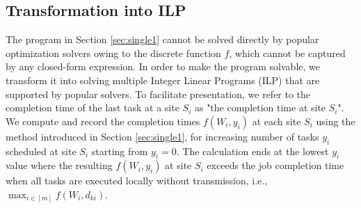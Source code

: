 \subsection{Transformation into ILP}
\label{sec:transformation}
The program in Section \ref{sec:single1} cannot be solved directly by popular optimization solvers owing to the discrete function $f$, which 
cannot be captured by any closed-form expression. %
In order to make the program solvable, we transform it into solving multiple Integer Linear Programs (ILP) that are supported by popular solvers. To facilitate presentation, we refer to the completion time of the last task at a site $S_i$ as "the completion time at site $S_i$". We compute and record the completion times $f(W_i, y_i)$ at each site $S_i$ using the method introduced in Section \ref{sec:single1}, for increasing number of tasks $y_i$ scheduled at site $S_i$ starting from $y_i=0$. %
The calculation ends at the lowest $y_i$ value where the resulting $f(W_i, y_i)$ at site $S_i$ exceeds the job completion time when all tasks are executed locally without transmission, i.e., $\max_{i\in[m]}f(W_i, d_{ki})$. 


